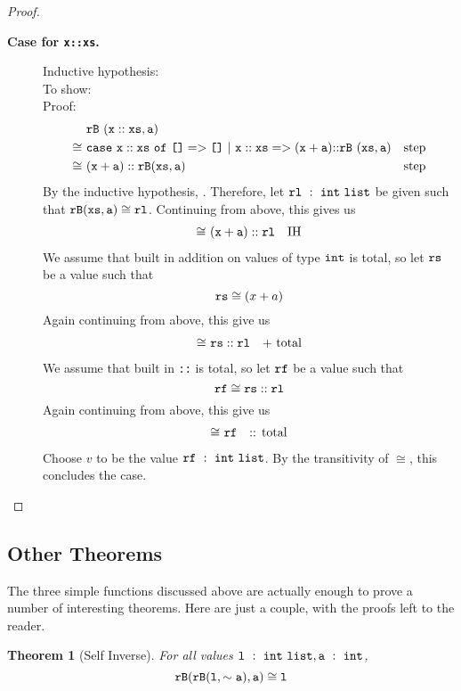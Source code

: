 \documentclass[11pt]{article}
\newtheorem{theorem}{Theorem}
\newcommand{\ttt}[1]{\texttt{#1}}
\begin{document}
\begin{proof}
\begin{description}
\item [\textbf{Case for \ttt{x::xs}.}]
  Inductive hypothesis: \\
  To show: \\
  Proof:
  \begin{align*}
          & {\mathtt{rB}}~{\mathtt{(\mathtt{x::xs},a)}} &\\
    \cong~& \mathtt{case}~{\mathtt{x::xs}}~\mathtt{of}~{\texttt{[]}} => {\texttt{[]}}~|~{\mathtt{x::xs}} => {\mathtt{(x+{a})}\mathtt{::}{\mathtt{rB}}~{\mathtt{(xs,{a})}}} & \text{step}\\
    \cong~& \mathtt{(x+a)::rB(xs,a)} & \text{step}\\
  \end{align*}
  By the inductive hypothesis, . Therefore, let
  ${\mathtt{rl}}\ :\ {{\mathtt{int}}~\mathtt{list}}$ be given such that
  ${\mathtt{rB(xs,a)}} \cong {\mathtt{rl}}$. Continuing from above, this gives us
  \begin{align*}
    \cong~& \mathtt{(x+a)::rl} & \text{IH}\\
  \end{align*}
  We assume that built in addition on values of type $\mathtt{int}$ is total, so
  let $\mathtt{rs}$ be a value such that $${\mathtt{rs}} \cong {(x+a)}$$ Again
  continuing from above, this give us
  \begin{align*}
    \cong~& \mathtt{rs::rl} & \text{+ total}\\
  \end{align*}
  We assume that built in \verb|::| is total, so let $\mathtt{rf}$ be a value
  such that $${\mathtt{rf}} \cong {\mathtt{rs::rl}}$$ Again continuing from above, this
  give us
  \begin{align*}
    \cong~& \mathtt{rf} & \text{:: total}\\
  \end{align*}
  Choose $v$ to be the value ${\mathtt{rf}}\ :\ {{\mathtt{int}}~\mathtt{list}}$. By the
  transitivity of $\cong$, this concludes the case.

\end{description}
\end{proof}

\subsection{Other Theorems}
The three simple functions discussed above are actually enough to prove a
number of interesting theorems. Here are just a couple, with the proofs
left to the reader.


\begin{theorem}[Self Inverse]
\label{thrm:inverse}
For all values $\mathtt{{l}}\ :\ {{\mathtt{int}}~\mathtt{list}},
\mathtt{{a}}\ :\ {\mathtt{int}}$, $${\mathtt{rB(rB{(l,\sim a)},a)}} \cong {\mathtt{l}}$$
\end{theorem}
\end{document}
